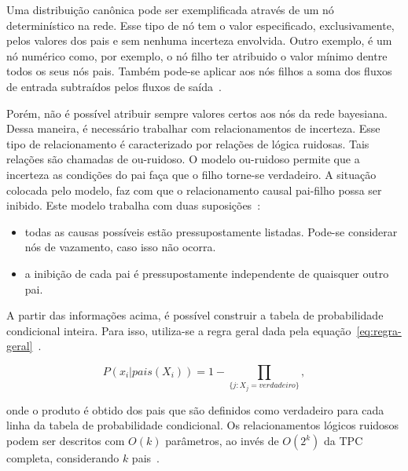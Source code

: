 Uma distribuição canônica pode ser exemplificada através de um nó determinístico na rede. Esse tipo de nó tem o valor especificado, exclusivamente, pelos valores dos pais e sem nenhuma incerteza envolvida. Outro exemplo, é um nó numérico como, por exemplo, o nó filho ter atribuido o valor mínimo dentre todos os seus nós pais. Também pode-se aplicar aos nós filhos a soma dos fluxos de entrada subtraídos pelos fluxos de saída~\cite{russell:2002}.

Porém, não é possível atribuir sempre valores certos aos nós da rede bayesiana. Dessa maneira, é necessário trabalhar com relacionamentos de incerteza. Esse tipo de relacionamento é caracterizado por relações de lógica ruidosas. Tais relações são chamadas de ou-ruidoso. O modelo ou-ruidoso permite que a incerteza as condições do pai faça que o filho torne-se verdadeiro. A situação colocada pelo modelo, faz com que o relacionamento causal pai-filho possa ser inibido. Este modelo trabalha com duas suposições~\cite{russell:2002}:

\begin{itemize}
    \item todas as causas possíveis estão pressupostamente listadas. Pode-se considerar nós de vazamento, caso isso não ocorra.
    \item a inibição de cada pai é pressupostamente independente de quaisquer outro pai.
\end{itemize}

A partir das informações acima, é possível construir a tabela de probabilidade condicional inteira. Para isso, utiliza-se a regra geral dada pela equação~\ref{eq:regra-geral}~\cite{russell:2002}.

\begin{equation}
    \label{eq:regra-geral}
    P(x_i|pais(X_i)) = 1 - \prod_{\{j:X_j = verdadeiro\}} ,
\end{equation}

onde o produto é obtido dos pais que são definidos como verdadeiro para cada linha da tabela de probabilidade condicional. Os relacionamentos lógicos ruidosos podem ser descritos com $O(k)$ parâmetros, ao invés de $O(2^k)$ da TPC completa, considerando $k$ pais~\cite{russell:2002}.


